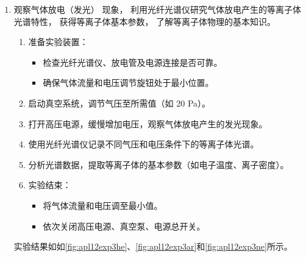\begin{enumerate}
	\item 观察气体放电（发光） 现象， 利用光纤光谱仪研究气体放电产生的等离子体光谱特性， 获得等离子体基本参数， 了解等离子体物理的基本知识。
	\begin{enumerate}
		\item 准备实验装置：
		\begin{itemize}
			\item 检查光纤光谱仪、放电管及电源连接是否可靠。
			\item 确保气体流量和电压调节旋钮处于最小位置。
		\end{itemize}
		\item 启动真空系统，调节气压至所需值（如 20 Pa）。
		\item 打开高压电源，缓慢增加电压，观察气体放电产生的发光现象。
		\item 使用光纤光谱仪记录不同气压和电压条件下的等离子体光谱。
		\item 分析光谱数据，提取等离子体的基本参数（如电子温度、离子密度）。
		\item 实验结束：
		\begin{itemize}
			\item 将气体流量和电压调至最小值。
			\item 依次关闭高压电源、真空泵、电源总开关。
		\end{itemize}
	\end{enumerate}
	
	实验结果如如\cref{fig:apl12exp3he}、\cref{fig:apl12exp3ar}和\cref{fig:apl12exp3ne}所示。
	

\end{enumerate}
